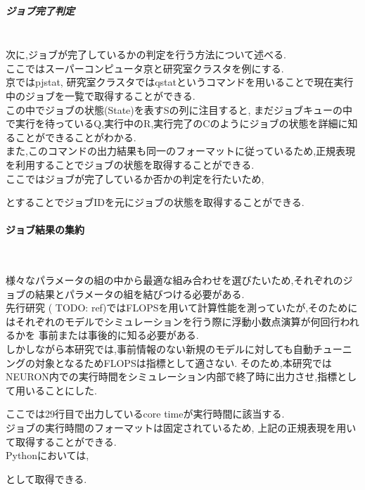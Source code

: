\subparagraph{ジョブ完了判定}~\\
次に,ジョブが完了しているかの判定を行う方法について述べる.\\
ここではスーパーコンピュータ京と研究室クラスタを例にする.\\
京ではpjstat, 研究室クラスタではqstatというコマンドを用いることで現在実行中のジョブを一覧で取得することができる.\\
この中でジョブの状態(State)を表すSの列に注目すると, まだジョブキューの中で実行を待っているQ,実行中のR,実行完了のCのようにジョブの状態を詳細に知ることができることがわかる.\\
また,このコマンドの出力結果も同一のフォーマットに従っているため,正規表現を利用することでジョブの状態を取得することができる.\\
ここではジョブが完了しているか否かの判定を行たいため,
{\footnotesize

}
とすることでジョブIDを元にジョブの状態を取得することができる.\\

\paragraph{ジョブ結果の集約}~\\
{\footnotesize

}
様々なパラメータの組の中から最適な組み合わせを選びたいため,それぞれのジョブの結果とパラメータの組を結びつける必要がある.\\
先行研究 ( TODO: ref)ではFLOPSを用いて計算性能を測っていたが,そのためにはそれぞれのモデルでシミュレーションを行う際に浮動小数点演算が何回行われるかを
事前または事後的に知る必要がある.\\
しかしながら本研究では,事前情報のない新規のモデルに対しても自動チューニングの対象となるためFLOPSは指標として適さない.
そのため,本研究ではNEURON内での実行時間をシミュレーション内部で終了時に出力させ,指標として用いることにした.\\
{\footnotesize

}
ここでは29行目で出力しているcore timeが実行時間に該当する.\\


ジョブの実行時間のフォーマットは固定されているため,
上記の正規表現を用いて取得することができる.\\
Pythonにおいては,
{\footnotesize

}
として取得できる.\\

